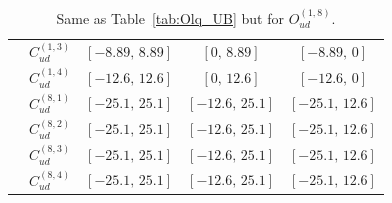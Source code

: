 \begin{table}[htbp]
{\begin{tabular}{ccccc}
        & $C_{ud}^{(1,3)}$ & $[-8.89,\, 8.89]$ & $[0,\, 8.89]$     & $[-8.89,\, 0]$    \\
        & $C_{ud}^{(1,4)}$ & $[-12.6,\, 12.6]$ & $[0,\, 12.6]$     & $[-12.6,\, 0]$    \\
        & $C_{ud}^{(8,1)}$ & $[-25.1,\, 25.1]$ & $[-12.6,\, 25.1]$ & $[-25.1,\, 12.6]$ \\
        & $C_{ud}^{(8,2)}$ & $[-25.1,\, 25.1]$ & $[-12.6,\, 25.1]$ & $[-25.1,\, 12.6]$ \\
        & $C_{ud}^{(8,3)}$ & $[-25.1,\, 25.1]$ & $[-12.6,\, 25.1]$ & $[-25.1,\, 12.6]$ \\
        & $C_{ud}^{(8,4)}$ & $[-25.1,\, 25.1]$ & $[-12.6,\, 25.1]$ & $[-25.1,\, 12.6]$ \\
    \bottomrule
\end{tabular}}
\caption{Same as Table~\ref{tab:Olq_UB} but for $O_{ud}^{(1,8)}$.}
\label{tab:Oud_UB}
\end{table}

